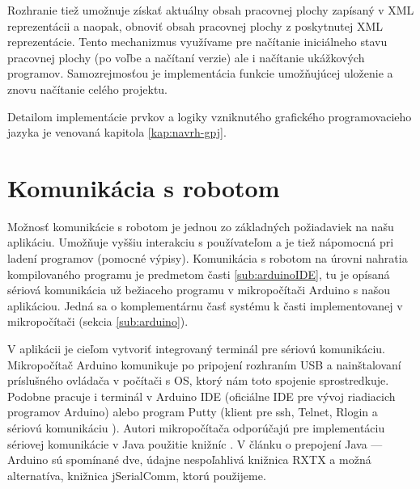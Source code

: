 Rozhranie tiež umožnuje získať aktuálny obsah pracovnej plochy zapísaný v XML reprezentácii a naopak, obnoviť obsah pracovnej plochy z poskytnutej XML reprezentácie. Tento mechanizmus využívame pre načítanie iniciálneho stavu pracovnej plochy (po voľbe a načítaní verzie) ale i načítanie ukážkových programov. Samozrejmosťou je implementácia funkcie umožňujúcej uloženie a znovu načítanie celého projektu.

Detailom implementácie prvkov a logiky vzniknutého grafického programovacieho jazyka je venovaná kapitola \ref{kap:navrh-gpj}.

\newpage

\section{Komunikácia s robotom}
Možnosť komunikácie s robotom je jednou zo základných požiadaviek na našu aplikáciu. Umožňuje vyššiu interakciu s používateľom a je tiež nápomocná pri ladení programov (pomocné výpisy). Komunikácia s robotom na úrovni nahratia kompilovaného programu je predmetom časti \ref{sub:arduinoIDE}, tu je opísaná sériová komunikácia už bežiaceho programu v mikropočítači Arduino s našou aplikáciou. Jedná sa o komplementárnu časť systému k časti implementovanej v mikropočítači (sekcia \ref{sub:arduino}).

V aplikácii je cieľom vytvoriť integrovaný terminál pre sériovú komunikáciu. Mikropočítač Arduino komunikuje po pripojení rozhraním USB a nainštalovaní príslušného ovládača v počítači s OS, ktorý nám toto spojenie sprostredkuje. Podobne pracuje i terminál v Arduino IDE (oficiálne IDE pre vývoj riadiacich programov Arduino) alebo program Putty (klient pre ssh, Telnet, Rlogin a sériovú komunikáciu \cite{putty}). Autori mikropočítača odporúčajú pre implementáciu sériovej komunikácie v Java použitie knižníc \cite{arduinoAndJava}. V článku o prepojení Java --- Arduino sú spomínané dve, údajne nespoľahlivá knižnica RXTX a možná alternatíva, knižnica jSerialComm, ktorú použijeme. 

